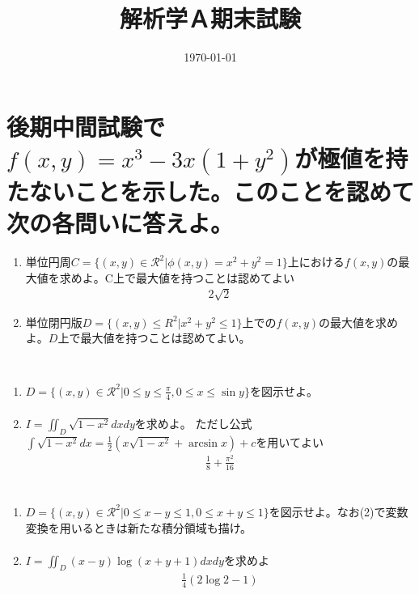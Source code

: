 \documentclass[a4paper,10pt]{jarticle}
\title{解析学Ａ期末試験}
\date{\today}
\begin{document}
\setlength{\parindent}{0pt}
\setlength{\columnseprule}{0.4pt}

\renewcommand{\thesection}{\fbox{\arabic{section}}}
\renewcommand{\labelenumi}{(\theenumi)}

\maketitle

\section{後期中間試験で$f(x,y)=x^3-3x(1+y^2)$が極値を持たないことを示した。このことを認めて次の各問いに答えよ。}
\begin{enumerate}
\item 単位円周$C=\{(x,y) \in \mathcal{R}^2 | \phi(x,y)=x^2+y^2=1\}$上における$f(x,y)$の最大値を求めよ。C上で最大値を持つことは認めてよい
\begin{gather*}
2\sqrt{2}
\end{gather*}
\item 単位閉円版$D=\{(x,y) \leq R^2|x^2+y^2 \leq 1\}$上での$f(x,y)$の最大値を求めよ。$D$上で最大値を持つことは認めてよい。
\begin{gather*}
\end{gather*}
\end{enumerate}

\section{}
\begin{enumerate}
\item$D=\{(x,y)\in \mathcal{R}^2|0 \leq y \leq \frac{\pi}{4}, 0 \leq x \leq \sin{y}\}$を図示せよ。
\begin{gather*}
\end{gather*}
\item $I=\iint_{D} \sqrt{1-x^2} dxdy$を求めよ。
ただし公式$\int\sqrt{1-x^2}dx=\frac{1}{2}(x\sqrt{1-x^2}+\arcsin{x})+c$を用いてよい
\begin{gather*}
\frac{1}{8}+\frac{\pi^2}{16}
\end{gather*}
\end{enumerate}

\section{}
\begin{enumerate}
\item $D=\{(x,y) \in \mathcal{R}^2 | 0 \leq x-y \leq 1, 0 \leq x+y \leq 1\}$を図示せよ。なお(2)で変数変換を用いるときは新たな積分領域も描け。
\begin{gather*}
\end{gather*}
\item$ I = \iint_{D} (x-y)\log{(x+y+1)}dxdy $を求めよ
\begin{gather*}
\frac{1}{4}(2\log{2}-1)
\end{gather*}
\end{enumerate}
\end{document}
